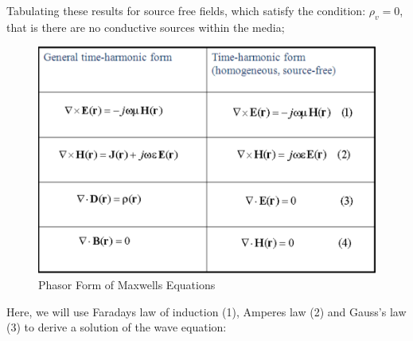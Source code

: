 \documentclass{book}
\begin{document}
Tabulating these results for source free fields, which satisfy the condition: $\rho_v = 0$, that is there are no conductive sources within the media;

\begin{figure}[h]
	\centering
	\includegraphics[width=0.5\linewidth]{Screenshots/phasor_maxwells_equations}
	\caption{Phasor Form of Maxwells Equations}
	\label{fig:phasormaxwellsequations}
\end{figure}


Here, we will use Faradays law of induction (1), Amperes law (2) and Gauss's law (3) to derive a solution of the wave equation:
\end{document}
